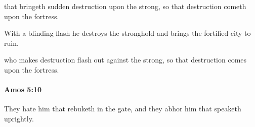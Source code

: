 			\begin{versebox}
					\item[BHS] 
					\item[LXX] 
					\item[ASV] that bringeth sudden destruction upon the strong, so that destruction cometh upon the fortress.
					\item[NIV] With a blinding flash he destroys the stronghold and brings the fortified city to ruin.
					\item[NRSV] who makes destruction flash out against the strong, so that destruction comes upon the fortress.
			\end{versebox}

		\paragraph{Amos 5:10} %
			\label{AMOS-5-10}

			They hate him that rebuketh in the gate, and they abhor him that speaketh uprightly.

